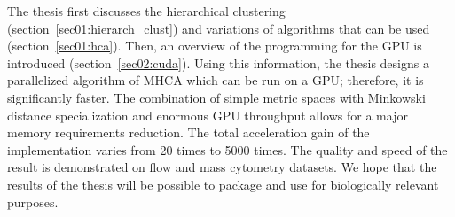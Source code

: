 The thesis first discusses the hierarchical clustering (section~\ref{sec01:hierarch_clust}) and variations of algorithms that can be used (section~\ref{sec01:hca}). Then, an overview of the programming for the GPU is introduced (section~\ref{sec02:cuda}). Using this information, the thesis designs a parallelized algorithm of MHCA which can be run on a GPU; therefore, it is significantly faster. The combination of simple metric spaces with Minkowski distance specialization and enormous GPU throughput allows for a major memory requirements reduction. The total acceleration gain of the implementation varies from 20 times to 5000 times. The quality and speed of the result is demonstrated on flow and mass cytometry datasets. We hope that the results of the thesis will be possible to package and use for biologically relevant purposes.


